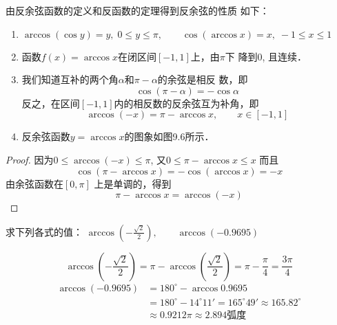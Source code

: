 由反余弦函数的定义和反函数的定理得到反余弦的性质
如下：
\begin{enumerate}
\item $\arccos(\cos y)=y,\; 0\le y\le \pi,\qquad \cos(\arccos x)=x,\; -1\le x\le 1$
\item 函数$f(x)=\arccos x$在闭区间$[-1,1]$上，由$\pi$下
降到0, 且连续．
\item 我们知道互补的两个角$\alpha$和$\pi-\alpha$的余弦是相反
数，即
\[\cos(\pi-\alpha)=-\cos\alpha\]
反之，在区间$[-1,1]$内的相反数的反余弦互为补角，即
\[\arccos(-x)=\pi-\arccos x,\qquad x\in [-1,1]\]

\item 反余弦函数$y=\arccos x$的图象如图9.6所示．
\begin{figure}[htp]
    \centering
{}
    \caption{}
\end{figure}
\end{enumerate}

\begin{proof}
    因为$0\le \arccos(-x)\le \pi$, 又$0\le \pi -\arccos x\le x$
而且
\[\cos(\pi -\arccos x)=-\cos(\arccos x)=-x\]
由余弦函数在$[0,\pi]$ 上是单调的，得到
\[\pi -\arccos x=\arccos (-x)\]
\end{proof}

\begin{example}
    求下列各式的值：
$\arccos\left(-\frac{\sqrt{2}}{2}\right),\qquad \arccos(-0.9695)$
\end{example}


\begin{solution}
\[\arccos\left(-\frac{\sqrt{2}}{2}\right)=\pi-\arccos\left(\frac{\sqrt{2}}{2}\right)=\pi-\frac{\pi}{4}=\frac{3\pi}{4}\]
\[\begin{split}
    \arccos(-0.9695)&=180^{\circ}-\arccos0.9695\\
    &=180^{\circ}-14^{\circ}11'=165^{\circ}49'\approx 165.82^{\circ}\\
    &\approx 0.9212\pi\approx 2.894\text{弧度}
\end{split}\]
\end{solution}


